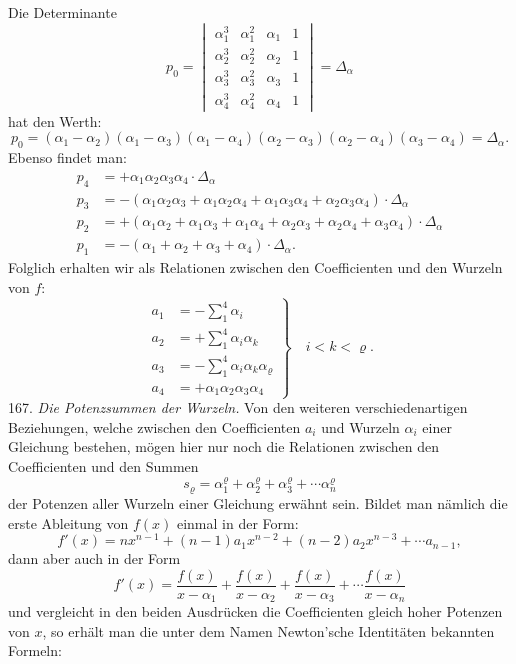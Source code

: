 Die Determinante
\[
p_0 =
\begin{vmatrix}
\alpha_1^{3} & \alpha_1^{2} & \alpha_1 & 1 \\
\alpha_2^{3} & \alpha_2^{2} & \alpha_2 & 1 \\
\alpha_3^{3} & \alpha_3^{2} & \alpha_3 & 1 \\
\alpha_4^{3} & \alpha_4^{2} & \alpha_4 & 1
\end{vmatrix}
= \Delta_\alpha
\]
hat den Werth:
\[
p_0 = (\alpha_1-\alpha_2)(\alpha_1-\alpha_3)(\alpha_1-\alpha_4)(\alpha_2-\alpha_3)(\alpha_2-\alpha_4)(\alpha_3-\alpha_4) = \Delta_\alpha.
\]
Ebenso findet man:
\[
\begin{aligned}
p_4 &= +\alpha_1\alpha_2\alpha_3\alpha_4 \cdot \Delta_\alpha \\
p_3 &= -(\alpha_1\alpha_2\alpha_3 + \alpha_1\alpha_2\alpha_4 + \alpha_1\alpha_3\alpha_4 + \alpha_2\alpha_3\alpha_4) \cdot \Delta_\alpha \\
p_2 &= +(\alpha_1\alpha_2 + \alpha_1\alpha_3 + \alpha_1\alpha_4 + \alpha_2\alpha_3 + \alpha_2\alpha_4 + \alpha_3\alpha_4) \cdot \Delta_\alpha \\
p_1 &= -(\alpha_1 + \alpha_2 + \alpha_3 + \alpha_4) \cdot \Delta_\alpha.
\end{aligned}
\]
Folglich erhalten wir als Relationen zwischen den Coefficienten und den Wurzeln von $f$:
\[
\left.
\begin{aligned}
a_1 &= -\sum_{1}^{4} \alpha_i \\
a_2 &= +\sum_{1}^{4} \alpha_i \alpha_k \\
a_3 &= -\sum_{1}^{4} \alpha_i \alpha_k \alpha_\varrho \\
a_4 &= +\alpha_1 \alpha_2 \alpha_3 \alpha_4
\end{aligned}
\right\}
\quad i < k < \varrho.
\]
167. \textit{Die Potenzsummen der Wurzeln.} Von den weiteren verschiedenartigen Beziehungen, welche zwischen den Coefficienten $a_i$ und Wurzeln $\alpha_i$ einer Gleichung bestehen, mögen hier nur noch die Relationen zwischen den Coefficienten und den Summen
\[
s_\varrho = \alpha_1^\varrho + \alpha_2^\varrho + \alpha_3^\varrho + \cdots \alpha_n^\varrho
\]
der Potenzen aller Wurzeln einer Gleichung erwähnt sein. Bildet man nämlich die erste Ableitung von $f(x)$ einmal in der Form:
\[
f'(x) = nx^{n-1} + (n-1)a_1 x^{n-2} + (n-2)a_2 x^{n-3} + \cdots a_{n-1},
\]
dann aber auch in der Form
\[
f'(x) = \frac{f(x)}{x-\alpha_1} + \frac{f(x)}{x-\alpha_2} + \frac{f(x)}{x-\alpha_3} + \cdots \frac{f(x)}{x-\alpha_n}
\]
und vergleicht in den beiden Ausdrücken die Coefficienten gleich hoher Potenzen von $x$, so erhält man die unter dem Namen \glqq Newton'sche Identitäten\grqq{} bekannten Formeln:


